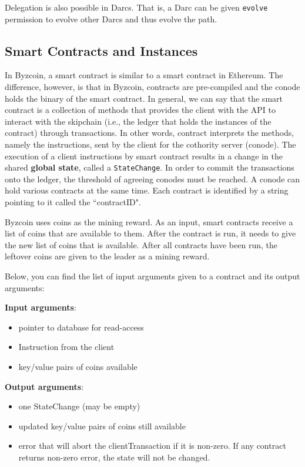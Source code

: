 Delegation is also possible in Darcs. That is, a Darc can be given \texttt{evolve} permission to evolve other Darcs and thus evolve the path.


\subsection{Smart Contracts and Instances} \label{background:smart_contract}
In Byzcoin, a smart contract is similar to a smart contract in Ethereum. The difference, however, is that in Byzcoin, contracts are pre-compiled and the conode holds the binary of the smart contract. In general, we can say that the smart contract is a collection of methods that provides the client with the API to interact with the skipchain (i.e., the ledger that holds the instances of the contract) through transactions. In other words, contract interprets the methods, namely the instructions, sent by the client for the cothority server (conode). The execution of a client instructions by smart contract results in a change in the shared \textbf{global state}, called a \texttt{StateChange}. In order to commit the transactions onto the ledger, the threshold of agreeing conodes must be reached. A conode can hold various contracts at the same time. Each contract is identified by a string pointing to it called the ``contractID". 

Byzcoin uses coins as the mining reward. As an input, smart contracts receive a list of coins that are available to them. After the contract is run, it needs to give the new list of coins that is available. After all contracts have been run, the leftover coins are given to the leader as a mining reward.

Below, you can find the list of input arguments given to a contract and its output arguments:

\textbf{Input arguments}: 
\begin{itemize}
    \item pointer to database for read-access
    \item Instruction from the client
    \item key/value pairs of coins available
\end{itemize}

\textbf{Output arguments}: 
\begin{itemize}
    \item one StateChange (may be empty)
    \item updated key/value pairs of coins still available
    \item error that will abort the clientTransaction if it is non-zero. If any contract returns non-zero error, the state will not be changed.
\end{itemize}

